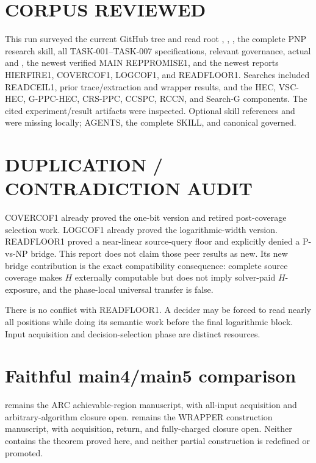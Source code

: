 \documentclass[11pt]{article}
\begin{document}
\section*{CORPUS REVIEWED}
This run surveyed the current GitHub tree and read root ,
, , the complete PNP research skill, all
TASK-001--TASK-007 specifications, relevant governance, actual
 and , the newest verified MAIN REPPROMISE1,
and the newest reports HIERFIRE1, COVERCOF1, LOGCOF1, and READFLOOR1.
Searches included READCEIL1, prior trace/extraction and wrapper results, and
the HEC, VSC-HEC, G-PPC-HEC, CRS-PPC, CCSPC, RCCN, and Search-G components.
The cited experiment/result artifacts were inspected. Optional skill
references  and
 were missing locally; AGENTS, the
complete SKILL, and canonical  governed.

\section*{DUPLICATION / CONTRADICTION AUDIT}
COVERCOF1 already proved the one-bit version and retired post-coverage
selection work. LOGCOF1 already proved the logarithmic-width version.
READFLOOR1 proved a near-linear source-query floor and explicitly denied a
P-vs-NP bridge. This report does not claim those peer results as new. Its new
bridge contribution is the exact compatibility consequence: complete source
coverage makes \(H\) externally computable but does not imply solver-paid
\(H\)-exposure, and the phase-local universal transfer is false.

There is no conflict with READFLOOR1. A decider may be forced to read nearly
all positions while doing its semantic work before the final logarithmic
block. Input acquisition and decision-selection phase are distinct resources.

\section*{Faithful main4/main5 comparison}
 remains the ARC achievable-region manuscript, with all-input
acquisition and arbitrary-algorithm closure open.  remains
the WRAPPER construction manuscript, with acquisition, return, and
fully-charged closure open. Neither contains the theorem proved here, and
neither partial construction is redefined or promoted.
\end{document}
